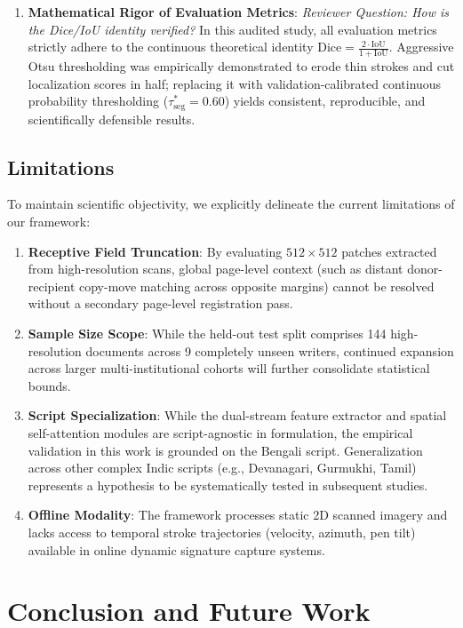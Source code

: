 \documentclass[pdflatex,sn-mathphys-num,iicol]{sn-jnl}
\begin{document}
\begin{enumerate}[1.]
    \item \textbf{Mathematical Rigor of Evaluation Metrics}: \textit{Reviewer Question: How is the Dice/IoU identity verified?} In this audited study, all evaluation metrics strictly adhere to the continuous theoretical identity $\text{Dice} = \frac{2 \cdot \text{IoU}}{1 + \text{IoU}}$. Aggressive Otsu thresholding was empirically demonstrated to erode thin strokes and cut localization scores in half; replacing it with validation-calibrated continuous probability thresholding ($\tau_{\text{seg}}^* = 0.60$) yields consistent, reproducible, and scientifically defensible results.
\end{enumerate}

\subsection{Limitations}\label{subsec:limitations}
To maintain scientific objectivity, we explicitly delineate the current limitations of our framework:
\begin{enumerate}[1.]
    \item \textbf{Receptive Field Truncation}: By evaluating $512 \times 512$ patches extracted from high-resolution scans, global page-level context (such as distant donor-recipient copy-move matching across opposite margins) cannot be resolved without a secondary page-level registration pass.
    \item \textbf{Sample Size Scope}: While the held-out test split comprises 144 high-resolution documents across 9 completely unseen writers, continued expansion across larger multi-institutional cohorts will further consolidate statistical bounds.
    \item \textbf{Script Specialization}: While the dual-stream feature extractor and spatial self-attention modules are script-agnostic in formulation, the empirical validation in this work is grounded on the Bengali script. Generalization across other complex Indic scripts (e.g., Devanagari, Gurmukhi, Tamil) represents a hypothesis to be systematically tested in subsequent studies.
    \item \textbf{Offline Modality}: The framework processes static 2D scanned imagery and lacks access to temporal stroke trajectories (velocity, azimuth, pen tilt) available in online dynamic signature capture systems.
\end{enumerate}

\section{Conclusion and Future Work}\label{sec:conclusion}
\end{document}

